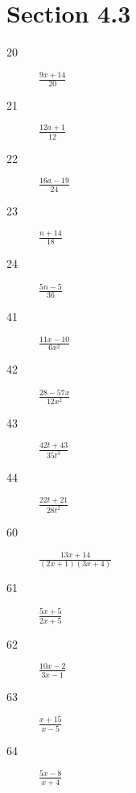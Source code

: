 \documentclass[letterpaper, landscape]{exam}
\begin{document}
  \ifprintanswers{}

    \section{Section 4.3} %
    
    \begin{description}
      \item[20] $\frac{9x + 14}{20}$

      \item[21] $\frac{12a + 1}{12}$

      \item[22] $\frac{16a - 19}{24}$

      \item[23] $\frac{n + 14}{18}$

      \item[24] $\frac{5n-5}{36}$

      \item[41] $\frac{11x - 10}{6x^2}$

      \item[42] $\frac{28 - 57x}{12x^2}$

      \item[43] $\frac{42t + 43}{35t^3}$

      \item[44] $\frac{22t + 21}{28t^2}$






      \item[60] $\frac{13x + 14}{(2x + 1)(3x + 4)}$

      \item[61] $\frac{5x + 5}{2x + 5}$

      \item[62] $\frac{10x - 2}{3x - 1}$

      \item[63] $\frac{x + 15}{x - 5}$

      \item[64] $\frac{5x - 8}{x + 4}$

    \end{description}
\end{document}
